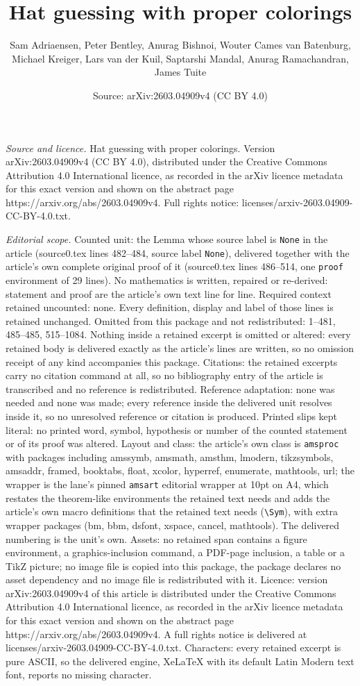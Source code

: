 \documentclass[10pt,a4paper]{amsart}
\title[Hat guessing with proper colorings]{Hat guessing with proper colorings}
\author{Sam Adriaensen, Peter Bentley, Anurag Bishnoi, Wouter Cames van Batenburg, Michael Kreiger, Lars van der Kuil, Saptarshi Mandal, Anurag Ramachandran, James Tuite}
\date{Source: arXiv:2603.04909v4 (CC BY 4.0)}
\begin{document}
\maketitle

\noindent\emph{Source and licence.} Hat guessing with proper colorings. Version arXiv:2603.04909v4 (CC BY 4.0), distributed under the Creative Commons Attribution 4.0 International licence, as recorded in the arXiv licence metadata for this exact version and shown on the abstract page https://arxiv.org/abs/2603.04909v4. Full rights notice: licenses/arxiv-2603.04909-CC-BY-4.0.txt.\par\smallskip

\noindent\textit{Editorial scope.} Counted unit: the Lemma whose source label is \texttt{None} in the article (source0.tex lines 482--484, source label \texttt{None}), delivered together with the article's own complete original proof of it (source0.tex lines 486--514, one \texttt{proof} environment of 29 lines). No mathematics is written, repaired or re-derived: statement and proof are the article's own text line for line. Required context retained uncounted: none. Every definition, display and label of those lines is retained unchanged. Omitted from this package and not redistributed: 1--481, 485--485, 515--1084. Nothing inside a retained excerpt is omitted or altered: every retained body is delivered exactly as the article's lines are written, so no omission receipt of any kind accompanies this package. Citations: the retained excerpts carry no citation command at all, so no bibliography entry of the article is transcribed and no reference is redistributed. Reference adaptation: none was needed and none was made; every reference inside the delivered unit resolves inside it, so no unresolved reference or citation is produced. Printed slips kept literal: no printed word, symbol, hypothesis or number of the counted statement or of its proof was altered. Layout and class: the article's own class is \texttt{amsproc} with packages including amssymb, amsmath, amsthm, lmodern, tikzsymbols, amsaddr, framed, booktabs, float, xcolor, hyperref, enumerate, mathtools, url; the wrapper is the lane's pinned \texttt{amsart} editorial wrapper at 10pt on A4, which restates the theorem-like environments the retained text needs and adds the article's own macro definitions that the retained text needs (\texttt{\textbackslash Sym}), with extra wrapper packages (bm, bbm, dsfont, xspace, cancel, mathtools). The delivered numbering is the unit's own. Assets: no retained span contains a figure environment, a graphics-inclusion command, a PDF-page inclusion, a table or a TikZ picture; no image file is copied into this package, the package declares no asset dependency and no image file is redistributed with it. Licence: version arXiv:2603.04909v4 of this article is distributed under the Creative Commons Attribution 4.0 International licence, as recorded in the arXiv licence metadata for this exact version and shown on the abstract page https://arxiv.org/abs/2603.04909v4. A full rights notice is delivered at licenses/arxiv-2603.04909-CC-BY-4.0.txt. Characters: every retained excerpt is pure ASCII, so the delivered engine, XeLaTeX with its default Latin Modern text font, reports no missing character.
\end{document}
